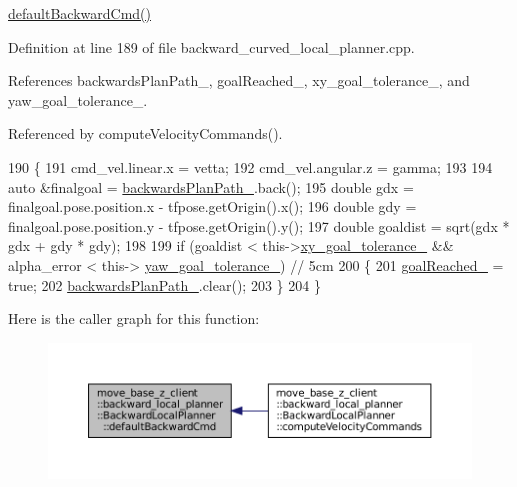 \hyperlink{classmove__base__z__client_1_1backward__local__planner_1_1BackwardLocalPlanner_a9f3977494d5f80884eb1a1d09b5b4673}{default\+Backward\+Cmd()} 

Definition at line 189 of file backward\+\_\+curved\+\_\+local\+\_\+planner.\+cpp.



References backwards\+Plan\+Path\+\_\+, goal\+Reached\+\_\+, xy\+\_\+goal\+\_\+tolerance\+\_\+, and yaw\+\_\+goal\+\_\+tolerance\+\_\+.



Referenced by compute\+Velocity\+Commands().


\begin{DoxyCode}
190 \{
191     cmd\_vel.linear.x = vetta;
192     cmd\_vel.angular.z = gamma;
193 
194     \textcolor{keyword}{auto} &finalgoal = \hyperlink{classmove__base__z__client_1_1backward__local__planner_1_1BackwardLocalPlanner_a451add2af7d6d83a7415277311b3ed04}{backwardsPlanPath\_}.back();
195     \textcolor{keywordtype}{double} gdx = finalgoal.pose.position.x - tfpose.getOrigin().x();
196     \textcolor{keywordtype}{double} gdy = finalgoal.pose.position.y - tfpose.getOrigin().y();
197     \textcolor{keywordtype}{double} goaldist = sqrt(gdx * gdx + gdy * gdy);
198 
199     \textcolor{keywordflow}{if} (goaldist < this->\hyperlink{classmove__base__z__client_1_1backward__local__planner_1_1BackwardLocalPlanner_a89ab1ee7283a474dc19970789f51c087}{xy\_goal\_tolerance\_} && alpha\_error < this->
      \hyperlink{classmove__base__z__client_1_1backward__local__planner_1_1BackwardLocalPlanner_a10d15842054d518159baa535afe6f1fd}{yaw\_goal\_tolerance\_}) \textcolor{comment}{// 5cm}
200     \{
201         \hyperlink{classmove__base__z__client_1_1backward__local__planner_1_1BackwardLocalPlanner_a0a89141d3d3a8ebfb9e1d69d0d33fd49}{goalReached\_} = \textcolor{keyword}{true};
202         \hyperlink{classmove__base__z__client_1_1backward__local__planner_1_1BackwardLocalPlanner_a451add2af7d6d83a7415277311b3ed04}{backwardsPlanPath\_}.clear();
203     \}
204 \}
\end{DoxyCode}
Here is the caller graph for this function\+:
\nopagebreak
\begin{figure}[H]
\begin{center}
\leavevmode
\includegraphics[width=350pt]{classmove__base__z__client_1_1backward__local__planner_1_1BackwardLocalPlanner_a9f3977494d5f80884eb1a1d09b5b4673_icgraph}
\end{center}
\end{figure}
